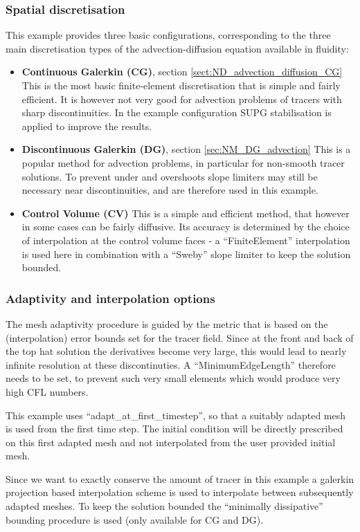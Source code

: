 \subsubsection{Spatial discretisation}
This example provides three basic configurations, corresponding to
the three main discretisation types of the advection-diffusion equation
available in fluidity:
\begin{itemize}
\item {\bf Continuous Galerkin (CG)}, section \ref{sect:ND_advection_diffusion_CG}
This is the most basic finite-element discretisation that is simple 
and fairly efficient. It is however not very good for advection problems
of tracers with sharp discontinuities. In the example configuration
SUPG stabilisation is applied to improve the results.
\item {\bf Discontinuous Galerkin (DG)}, section \ref{sec:NM_DG_advection}
This is a popular method for advection problems, in particular 
for non-smooth tracer solutions. To prevent under and overshoots
slope limiters may still be necessary near discontinuities, and are
therefore used in this example.
\item {\bf Control Volume (CV)}
This is a simple and efficient method, that however in some cases 
can be fairly diffusive. Its accuracy is determined by the choice 
of interpolation at the control volume faces - a ``FiniteElement''
interpolation is used here in combination with a ``Sweby'' slope 
limiter to keep the solution bounded. 
\end{itemize}

\subsubsection{Adaptivity and interpolation options}
The mesh adaptivity procedure is guided by the metric that is based on
the (interpolation) error bounds set for the tracer field. Since at 
the front and back of the top hat solution the derivatives 
become very large, this would lead to nearly infinite resolution at these
discontinuties. A ``MinimumEdgeLength'' therefore needs to be set, to prevent
such very small elements which would produce very high CFL numbers.

This example uses ``adapt\_at\_first\_timestep'', so that a suitably
adapted mesh is used from the first time step. The initial condition
will be directly prescribed on this first adapted mesh and not interpolated
from the user provided initial mesh.

Since we want to exactly conserve the amount of tracer in this example
a galerkin projection based interpolation scheme is used to interpolate
between subsequently adapted meshes. To keep the solution bounded the
``minimally dissipative'' bounding procedure is used (only available for CG and DG).

